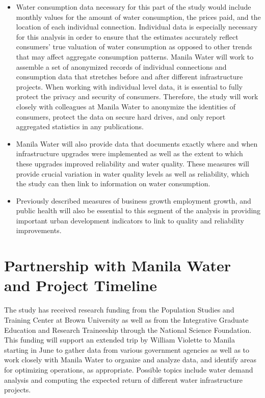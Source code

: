 \documentclass{article}
\begin{document}
\begin{itemize}
\item  Water consumption data necessary for this part of the study would include monthly values for the amount of water consumption, the prices paid, and the location of each individual connection.  Individual data is especially necessary for this analysis in order to ensure that the estimates accurately reflect consumers' true valuation of water consumption as opposed to other trends that may affect aggregate consumption patterns.   Manila Water will work to assemble a set of anonymized records of individual connections and consumption data that stretches before and after different infrastructure projects.  When working with individual level data, it is essential to fully protect the privacy and security of consumers.  Therefore, the study will work closely with colleagues at Manila Water to anonymize the identities of consumers, protect the data on secure hard drives, and only report aggregated statistics in any publications.
\item Manila Water will also provide data that documents exactly where and when infrastructure upgrades were implemented as well as the extent to which these upgrades improved reliability and water quality.  These measures will provide crucial variation in water quality levels as well as reliability, which the study can then link to information on water consumption.
\item Previously described measures of business growth employment growth, and public health will also be essential to this segment of the analysis in providing important urban development indicators to link to quality and reliability improvements.
\end{itemize}

\section*{Partnership with Manila Water and Project Timeline}

The study has received research funding from the Population Studies and Training Center at Brown University as well as from the Integrative Graduate Education and Research Traineeship through the National Science Foundation.  This funding will support an extended trip by William Violette to Manila starting in June to gather data from various government agencies as well as to work closely with Manila Water to organize and analyze data, and identify areas for optimizing operations, as appropriate.   Possible topics include water demand analysis and computing the expected return of different water infrastructure projects.



%
%
\end{document}
